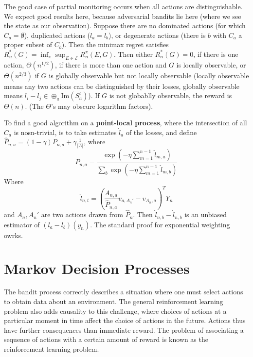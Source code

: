 The good case of partial monitoring occurs when all actions are distinguishable. We expect good results here, because adversarial bandits lie here (where we see the state as our observation). Suppose there are no dominated actions (for which $C_a = \emptyset$), duplicated actions ($l_a = l_b$), or degenerate actions (there is $b$ with $C_a$ a proper subset of $C_b$). Then the minimax regret satisfies $R_n^*(G) = \inf_\pi \sup_{E \in \mathcal{E}} R_n^\pi(E, G)$. Then either $R_n^*(G) = 0$, if there is one action, $\Theta(n^{1/2})$, if there is more than one action and $G$ is locally observable, or $\Theta(n^{2/3})$ if $G$ is globally observable but not locally observable (locally observable means any two actions can be distinguished by their losses, globally observable means $l_i - l_j \in \oplus_a \text{Im}(S_a^t)$). If $G$ is not globablly observable, the reward is $\Theta(n)$. (The $\Theta$'s may obscure logarithm factors).

To find a good algorithm on a {\bf point-local process}, where the intersection of all $C_a$ is nosn-trivial, is to take estimates $\hat{l}_a$ of the losses, and define $\hat{P}_{n,a} = (1 - \gamma) P_{n,a} + \gamma \frac{1}{|A|}$, where
%
\[ P_{n,a} = \frac{\exp(- \eta \sum_{m = 1}^{n-1} \hat{l}_{m,a})}{\sum_b \exp(- \eta \sum_{m = 1}^{n-1} \hat{l}_{m,b})} \]
%
Where
%
\[ \hat{l}_{n,t} = \left( \frac{A_{n,a}}{\hat{P}_{n,a}} v_{a,A_n'} - v_{A_n,a} \right)^T Y_n \]
%
and $A_n, A_n'$ are two actions drawn from $\hat{P}_n$. Then $\hat{l}_{n,b} - \hat{l}_{n,b}$ is an unbiased estimator of $(l_a - l_b)(y_n)$. The standard proof for exponential weighting owrks.










\part{Markov Decision Processes}

The bandit process correctly describes a situation where one must select actions to obtain data about an environment. The general reinforcement learning problem also adds causality to this challenge, where choices of actions at a particular moment in time affect the choice of actions in the future. Actions thus have further consequences than immediate reward. The problem of associating a sequence of actions with a certain amount of reward is known as the reinforcement learning problem.

